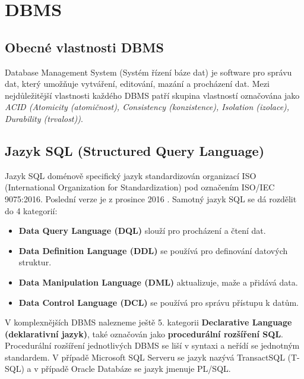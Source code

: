 \documentclass[czech,bachelor,public,dept460,male,cpdeclaration,twoside]{diploma}
\begin{document}
\section{DBMS} \label{dbms}
\subsection{Obecné vlastnosti DBMS}
Database Management System (Systém řízení báze dat) je software pro správu dat, který umožňuje vytváření, editování, mazání a procházení dat. Mezi nejdůležitější vlastnosti každého DBMS patří skupina vlastností označována jako \textit{ACID (Atomicity (atomičnost), Consistency (konzistence), Isolation (izolace), Durability (trvalost))}.

\subsection{Jazyk SQL (Structured Query Language)}
Jazyk SQL doménově specifický jazyk standardizován organizací ISO (International Organization for Standardization) pod označením ISO/IEC 9075:2016. Poslední verze je z prosince 2016 \cite{sqliso}. Samotný jazyk SQL se dá rozdělit do 4 kategorií:
\begin{itemize}
  \item \textbf{Data Query Language (DQL)} slouží pro procházení a čtení dat.
  \item \textbf{Data Definition Language (DDL)} se používá pro definování datových struktur.
  \item \textbf{Data Manipulation Language (DML)} aktualizuje, maže a přidává data.
  \item \textbf{Data Control Language (DCL)} se používá pro správu přístupu k datům.
\end{itemize}

V komplexnějších DBMS nalezneme ještě 5. kategorii \textbf{Declarative Language (deklarativní jazyk)}, také označován jako \textbf{procedurální rozšíření SQL}. Procedurální rozšíření jednotlivých DBMS se liší v syntaxi a neřídí se jednotným standardem. V případě Microsoft SQL Serveru se jazyk nazývá TransactSQL (T-SQL) a v případě Oracle Databáze se jazyk jmenuje PL/SQL.
\end{document}

